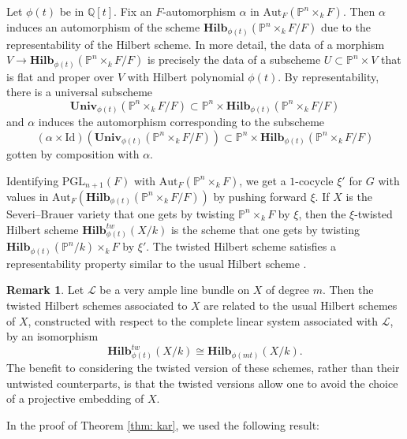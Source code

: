 \documentclass[12pt]{amsart}
\theoremstyle{definition}
\newtheorem{rmk}[thm]{Remark}
\newcommand{\Hilb}{\mathbf{Hilb}}
\begin{document}
Let $\phi(t)$ be in $\mathbb{Q}[t]$. Fix an $F$-automorphism $\alpha$ in $\mathrm{Aut}_F(\mathbb{P}^n\times_k F)$. Then $\alpha$ induces an automorphism of the scheme $\Hilb_{\phi(t)}(\mathbb{P}^n\times_k F/F)$ due to the representability of the Hilbert scheme. In more detail, the data of a morphism $V\rightarrow \Hilb_{\phi(t)}(\mathbb{P}^n\times_k F/F)$ is precisely the data of a subscheme $U\subset \mathbb{P}^n\times V$ that is flat and proper over $V$ with Hilbert polynomial $\phi(t)$. By representability, there is a universal subscheme \[\mathbf{Univ}_{\phi(t)}(\mathbb{P}^n\times_k F/F)\subset \mathbb{P}^n\times \Hilb_{\phi(t)}(\mathbb{P}^n\times_k F/F)\]
and $\alpha$ induces the automorphism corresponding to the subscheme \[(\alpha \times \mathrm{Id})(\mathbf{Univ}_{\phi(t)}(\mathbb{P}^n\times_k F/F))\subset \mathbb{P}^n\times \Hilb_{\phi(t)}(\mathbb{P}^n\times_k F/F)\] gotten by composition with $\alpha$.

Identifying $\mathrm{PGL}_{n+1}(F)$ with $\mathrm{Aut}_F(\mathbb{P}^n\times_k F)$, we get a $1$-cocycle $\xi'$ for $G$ with values in $\mathrm{Aut}_F(\Hilb_{\phi(t)}(\mathbb{P}^n\times_k F/F))$ by pushing forward $\xi$. If $X$ is the Severi--Brauer variety that one gets by twisting $\mathbb{P}^n\times_k F$ by $\xi$, then the $\xi$-twisted Hilbert scheme $\Hilb_{\phi(t)}^{tw}(X/k)$ is the scheme that one gets by twisting $\Hilb_{\phi(t)}(\mathbb{P}^n/k)\times_k F$ by $\xi'$. The twisted Hilbert scheme satisfies a representability property similar to the usual Hilbert scheme \cite[Theorem 2.5]{em}.

\begin{rmk}
Let $\mathcal{L}$ be a very ample line bundle on $X$ of degree $m$. Then the twisted Hilbert schemes associated to $X$ are related to the usual Hilbert schemes of $X$, constructed with respect to the complete linear system associated with $\mathcal{L}$, by an isomorphism \[\Hilb^{tw}_{\phi(t)}(X/k)\cong \Hilb_{\phi(mt)}(X/k).\] The benefit to considering the twisted version of these schemes, rather than their untwisted counterparts, is that the twisted versions allow one to avoid the choice of a projective embedding of $X$.
\end{rmk}

In the proof of Theorem \ref{thm: kar}, we used the following result:
\end{document}
